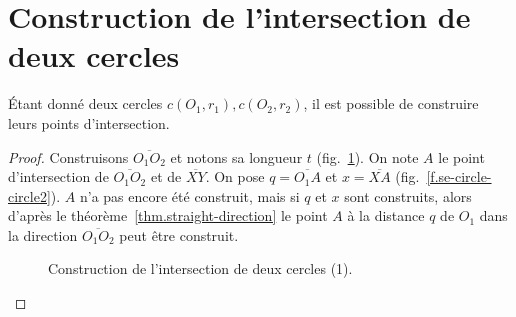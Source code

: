 \section{Construction de l'intersection de deux cercles}\label{s.two-circles}

\begin{theorem}
Étant donné deux cercles $c(O_1,r_1), c(O_2,r_2)$, il est possible de construire leurs points d'intersection.
\end{theorem}

\begin{proof}
Construisons $\overline{O_1O_2}$ et notons sa longueur $t$ (fig.~\ref{f.se-circle-circle1}).
On note $A$ le point d'intersection de $\overline{O_1O_2}$ et de $\overline{XY}$. On pose  $q=\overline{O_1A}$ et  $x=\overline{XA}$ (fig.~\ref{f.se-circle-circle2}). $A$ n'a pas encore été construit, mais si $q$ et $x$ sont construits, alors d'après le théorème~\ref{thm.straight-direction} le point $A$ à la distance $q$ de $O_1$ dans la direction $\overline{O_1O_2}$ peut être construit.

\begin{figure}[htbp]
\centering
{}
\caption{Construction de l'intersection de deux cercles (1).}\label{f.se-circle-circle1}
\end{figure}


\end{proof}
